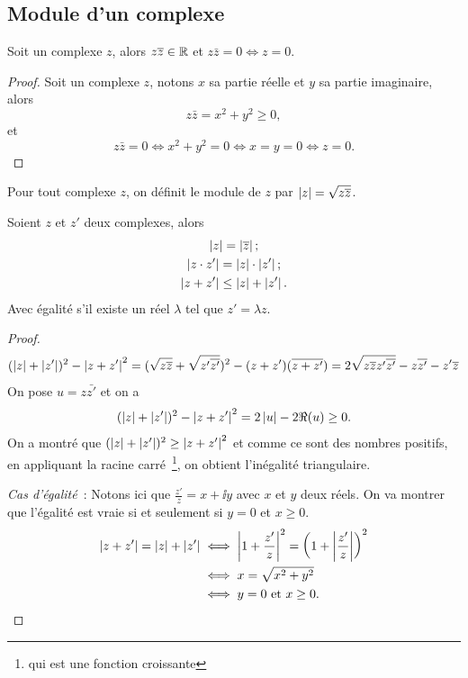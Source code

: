 \subsection{Module d'un complexe}
\label{subsec:modulecomplexe}
\begin{prop}
  Soit un complexe $z$, alors $z \overline{z} \in \mathbb{R}$ et $z \bar{z}=0 \iff z = 0$.
\end{prop}
\begin{proof}
  Soit un complexe $z$, notons $x$ sa partie réelle et $y$ sa partie imaginaire, alors
  \begin{equation}
    z \bar{z}=x^2+y^2 \geq 0,
  \end{equation}
  et
  \begin{equation}
    z \bar{z}=0 \iff x^2+y^2=0 \iff x=y=0 \iff z=0.
  \end{equation}
\end{proof}
%
\begin{defdef}
  Pour tout complexe $z$, on définit le module de $z$ par $\left\lvert z\right\rvert=\sqrt{z \overline{z}}$.
\end{defdef}
%
\begin{prop}
  Soient $z$ et $z'$ deux complexes, alors
  \begin{gather}
    \left\lvert z\right\rvert=\left\lvert\overline{z}\right\rvert; \\
    \left\lvert z \cdot z'\right\rvert=\left\lvert z\right\rvert \cdot \left\lvert z'\right\rvert; \\
    \left\lvert z+z'\right\rvert\leq\left\lvert z\right\rvert+\left\lvert z'\right\rvert.
  \end{gather}
  Avec égalité s'il existe un réel $\lambda$ tel que $z'=\lambda z$.
\end{prop}
\begin{proof}
  \begin{equation}
    (\left\lvert z\right\rvert+\left\lvert z'\right\rvert)^2-\left\lvert z+z'\right\rvert^2
    =(\sqrt{z \overline{z}} +\sqrt{z' \overline{z'}})^2 - (z+z')(\overline{z+z'})
    =2 \sqrt{z \overline{z} z' \overline{z'}} - z \overline{z'} - z'\overline{z}
  \end{equation}
  On pose $u=z \bar{z'}$ et on a
  \begin{equation}
    (\left\lvert z\right\rvert+\left\lvert z'\right\rvert)^2-\left\lvert z+z'\right\rvert^2=2 \left\lvert u\right\rvert-2 \Re(u) \geq 0.
  \end{equation}
  On a montré que $(\left\lvert z\right\rvert+\left\lvert z'\right\rvert)^2 \geq \left\lvert z+z'\right\rvert^2$ et comme ce sont des nombres positifs, en appliquant la racine carré~\footnote{qui est une fonction croissante}, on obtient l'inégalité triangulaire.

  \emph{Cas d'égalité}~: Notons ici que $\frac{z'}{z}=x + \ii y$ avec $x$ et $y$ deux réels. On va montrer que l'égalité est vraie si et seulement si $y=0$ et $x \geq 0$.
  \begin{align}
    \left\lvert z+z'\right\rvert=\left\lvert z\right\rvert+\left\lvert z'\right\rvert &\iff \left\lvert1+\frac{z'}{z}\right\rvert^2=\left(1+\left\lvert\frac{z'}{z}\right\rvert\right)^2 \\
    &\iff x = \sqrt{x^2+y^2}\\
    &\iff y=0 \text{~et~} x \geq 0.
  \end{align}
\end{proof}
